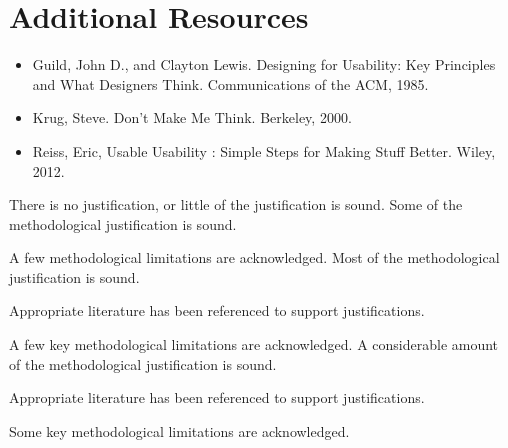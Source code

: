 \documentclass{../../fal_assignment}
\begin{document}
\section*{Additional Resources}
\begin{itemize}
    \item Guild, John D., and Clayton Lewis. Designing for Usability: Key Principles and What Designers Think. Communications of the ACM, 1985.
    \item Krug, Steve. Don't Make Me Think. Berkeley, 2000. 
    \item Reiss, Eric, Usable Usability : Simple Steps for Making Stuff Better. Wiley, 2012.
\end{itemize}

\rubricyeartwo

\begin{markingrubric}
%
%
        \grade\fail 	There is no justification, or little of the justification is sound.
        \grade 		Some of the methodological justification is sound.
        \par	           A few methodological limitations are acknowledged. 
        \grade 		Most of the methodological justification is sound.
        \par		Appropriate literature has been referenced to support justifications.
        \par 		A few key methodological limitations are acknowledged. 
        \grade 		A considerable amount of the methodological justification is sound.
        \par		Appropriate literature has been referenced to support justifications.
        \par 		Some key methodological limitations are acknowledged. 

\end{markingrubric}
\end{document}
